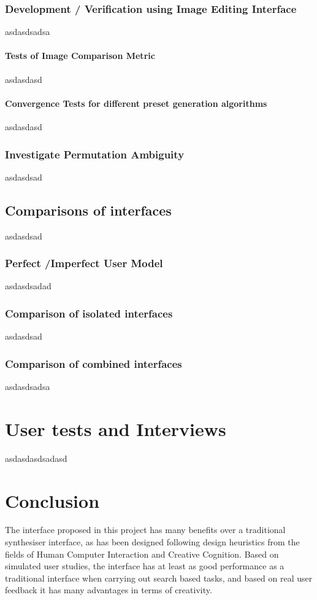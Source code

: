 \documentclass[11pt, oneside]{report}   	%
\begin{document}
\subsection{Development / Verification using Image Editing Interface}
asdasdsadsa
\subsubsection{Tests of Image Comparison Metric}
asdasdasd
\subsubsection{Convergence Tests for different preset generation algorithms}
asdasdasd
\subsection{Investigate Permutation Ambiguity}
asdasdsad

\section{Comparisons of interfaces}
asdasdsad
\subsection{Perfect /Imperfect User Model}
asdasdsadad
\subsection{Comparison of isolated interfaces}
asdasdsad
\subsection{Comparison of combined interfaces}
asdasdsadsa

\chapter{User tests and Interviews}
asdasdasdsadasd

\chapter{Conclusion}
The interface proposed in this project has many benefits over a traditional synthesiser interface, as has been designed following design heuristics from the fields of Human Computer Interaction and Creative Cognition. Based on simulated user studies, the interface has at least as good performance as a traditional interface when carrying out search based tasks, and based on real user feedback it has many advantages in terms of creativity.
\end{document}
